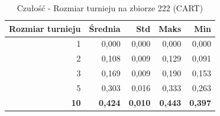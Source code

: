\begin{table}[htbp]
\centering
\small
\setlength{\tabcolsep}{6pt}
\renewcommand{\arraystretch}{1.2}
\caption{Czułość - Rozmiar turnieju na zbiorze 222 (CART)}
\label{tab:CART_tournament_size_222_recall}
\begin{tabular}{r|r|r|r|r}
\toprule
Rozmiar turnieju & Średnia & Std & Maks & Min \\
\hline
1 & 0,000 & 0,000 & 0,000 & 0,000 \\
2 & 0,108 & 0,009 & 0,129 & 0,091 \\
3 & 0,169 & 0,009 & 0,190 & 0,153 \\
5 & 0,303 & 0,016 & 0,333 & 0,263 \\
\textbf{10} & \textbf{0,424} & \textbf{0,010} & \textbf{0,443} & \textbf{0,397} \\
\bottomrule
\end{tabular}
\end{table}